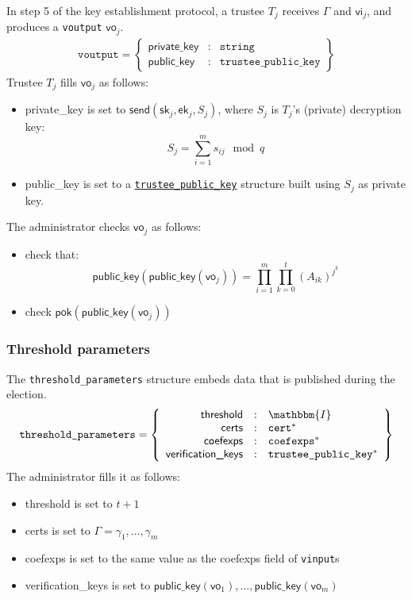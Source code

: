 \documentclass[a4paper]{article}
\newcommand{\I}{\mathbbm{I}}
\newcommand{\jstring}{\texttt{string}}
\begin{document}
In step 5 of the key establishment protocol, a trustee $T_j$ receives
$\Gamma$ and $\textsf{vi}_j$, and produces a \texttt{voutput}
$\textsf{vo}_j$.
\begin{gather*}
  \texttt{voutput}=\left\{
    \begin{array}{rcl}
      \textsf{private\_key}&:&\jstring\\
      \textsf{public\_key}&:&\texttt{trustee\_public\_key}
    \end{array}
  \right\}
\end{gather*}
Trustee $T_j$ fills $\textsf{vo}_j$ as follows:
\begin{itemize}
\item \textsf{private\_key} is set to
  $\textsf{send}(\textsf{sk}_j,\textsf{ek}_j,S_j)$, where $S_j$ is $T_j$'s
  (private) decryption key:
  \[
    S_j=\sum_{i=1}^m s_{ij}\mod q
  \]
\item \textsf{public\_key} is set to a
  \hyperref[trustee-keys]{\texttt{trustee\_public\_key}} structure
  built using $S_j$ as private key.
\end{itemize}
The administrator checks $\textsf{vo}_j$ as follows:
\begin{itemize}
\item check that:
  \[
    \textsf{public\_key}(\textsf{public\_key}(\textsf{vo}_j))=\prod_{i=1}^m \prod_{k=0}^t (A_{ik})^{j^k}
  \]
\item check $\textsf{pok}(\textsf{public\_key}(\textsf{vo}_j))$
\end{itemize}

\subsubsection{Threshold parameters}
\label{threshold-params}

The \texttt{threshold\_parameters} structure embeds data that is
published during the election.
\begin{gather*}
  \texttt{threshold\_parameters}=\left\{
    \begin{array}{rcl}
      \textsf{threshold}&:&\I\\
      \textsf{certs}&:&\texttt{cert}^\ast\\
      \textsf{coefexps}&:&\texttt{coefexps}^\ast\\
      \textsf{verification\_keys}&:&\texttt{trustee\_public\_key}^\ast
    \end{array}
  \right\}
\end{gather*}
The administrator fills it as follows:
\begin{itemize}
\item \textsf{threshold} is set to $t+1$
\item \textsf{certs} is set to $\Gamma=\gamma_1,\dotsc,\gamma_m$
\item \textsf{coefexps} is set to the same value as the
  \textsf{coefexps} field of \texttt{vinput}s
\item \textsf{verification\_keys} is set to
  $\textsf{public\_key}(\textsf{vo}_1),\dotsc,\textsf{public\_key}(\textsf{vo}_m)$
\end{itemize}
\end{document}
